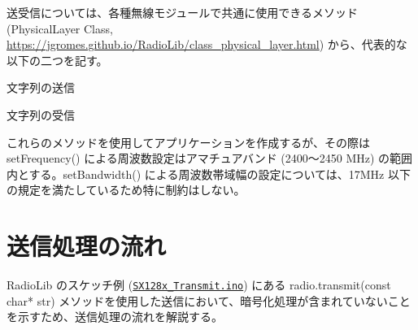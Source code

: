 \documentclass[a4j,oneside]{ujbook}
\begin{document}
送受信については、各種無線モジュールで共通に使用できるメソッド (PhysicalLayer Class, \url{https://jgromes.github.io/RadioLib/class_physical_layer.html}) から、代表的な以下の二つを記す。

\begin{description}[style=sameline]
 \item[transmit()] 文字列の送信
 \item[receive()] 文字列の受信
\end{description}

これらのメソッドを使用してアプリケーションを作成するが、その際は setFrequency() による周波数設定はアマチュアバンド (2400〜2450 MHz) の範囲内とする。setBandwidth() による周波数帯域幅の設定については、17MHz 以下の規定を満たしているため特に制約はしない。

\section*{送信処理の流れ}

RadioLib のスケッチ例 (\href{https://github.com/jgromes/RadioLib/blob/master/examples/SX128x/SX128x_Transmit/SX128x_Transmit.ino}{\tt{SX128x\_Transmit.ino}}) にある radio.transmit(const char* str) メソッドを使用した送信において、暗号化処理が含まれていないことを示すため、送信処理の流れを解説する。
\end{document}
